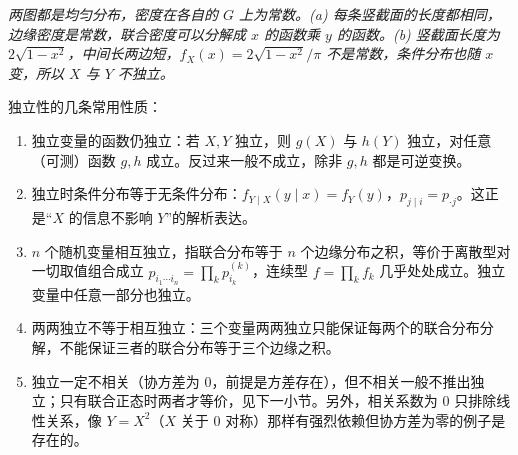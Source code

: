 \begin{center}
\par\vspace{2pt}
{\footnotesize\itshape 两图都是均匀分布，密度在各自的 $G$ 上为常数。(a) 每条竖截面的长度都相同，边缘密度是常数，联合密度可以分解成 $x$ 的函数乘 $y$ 的函数。(b) 竖截面长度为 $2\sqrt{1-x^2}$，中间长两边短，$f_X(x)=2\sqrt{1-x^2}/\pi$ 不是常数，条件分布也随 $x$ 变，所以 $X$ 与 $Y$ 不独立。}
\end{center}

独立性的几条常用性质：
\begin{enumerate}[label=(\arabic*),leftmargin=2.2em]
\item 独立变量的函数仍独立：若 $X,Y$ 独立，则 $g(X)$ 与 $h(Y)$ 独立，对任意（可测）函数 $g,h$ 成立。反过来一般不成立，除非 $g,h$ 都是可逆变换。
\item 独立时条件分布等于无条件分布：$f_{Y\mid X}(y\mid x)=f_Y(y)$，$p_{j\mid i}=p_{\cdot j}$。这正是“$X$ 的信息不影响 $Y$”的解析表达。
\item $n$ 个随机变量相互独立，指联合分布等于 $n$ 个边缘分布之积，等价于离散型对一切取值组合成立 $p_{i_1\cdots i_n}=\prod_k p^{(k)}_{i_k}$，连续型 $f=\prod_k f_k$ 几乎处处成立。独立变量中任意一部分也独立。
\item 两两独立不等于相互独立：三个变量两两独立只能保证每两个的联合分布分解，不能保证三者的联合分布等于三个边缘之积。
\item 独立一定不相关（协方差为 $0$，前提是方差存在），但不相关一般不推出独立；只有联合正态时两者才等价，见下一小节。另外，相关系数为 $0$ 只排除线性关系，像 $Y=X^2$（$X$ 关于 $0$ 对称）那样有强烈依赖但协方差为零的例子是存在的。
\end{enumerate}

